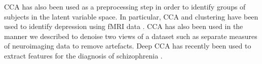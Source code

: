 CCA has also been used as a preprocessing step in order to identify groups of subjects in the latent variable space.
In particular, CCA and clustering have been used to identify depression using fMRI data \cite{dinga2019evaluating} \cite{drysdale2017resting}.
CCA has also been used in the manner we described to denoise two views of a dataset such as separate measures of neuroimaging data \cite{zhuang2020technical} to remove artefacts.
Deep CCA has recently been used to extract features for the diagnosis of schizophrenia \cite{qi2016deep}.






